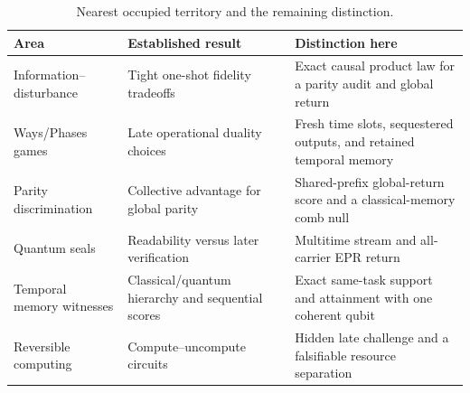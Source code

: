 \begin{table}[t]
\centering
\caption{Nearest occupied territory and the remaining distinction.}
\label{tab:adjacent}
\small
\begin{tabularx}{0.94\textwidth}{@{}p{}YY@{}}
\toprule
Area & Established result & Distinction here \\
\midrule
Information--disturbance & Tight one-shot fidelity tradeoffs & Exact causal product law for a parity audit and global return \\
Ways/Phases games & Late operational duality choices & Fresh time slots, sequestered outputs, and retained temporal memory \\
Parity discrimination & Collective advantage for global parity & Shared-prefix global-return score and a classical-memory comb null \\
Quantum seals & Readability versus later verification & Multitime stream and all-carrier EPR return \\
Temporal memory witnesses & Classical/quantum hierarchy and sequential scores & Exact same-task support and attainment with one coherent qubit \\
Reversible computing & Compute--uncompute circuits & Hidden late challenge and a falsifiable resource separation \\
\bottomrule
\end{tabularx}
\end{table}
